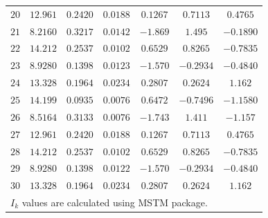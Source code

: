 \documentclass[preprint,3p]{elsarticle}
\begin{document}
\begin{table}[h]
\begin{center}
\begin{tabular}{|c|c|c|c|c|c|c|}
			$20$ & $12.961$ & $0.2420$ & $0.0188$ & $0.1267$ & $0.7113$ & $0.4765$ \\
			$21$ & $8.2160$ & $0.3217$ & $0.0142$ & $-1.869$ & $1.495$ & $-0.1890$ \\
			$22$ & $14.212$ & $0.2537$ & $0.0102$ & $0.6529$ & $0.8265$ & $-0.7835$ \\
			$23$ & $8.9280$ & $0.1398$ & $0.0123$ & $-1.570$ &	$-0.2934$ & $-0.4840$ \\
			$24$ & $13.328$ & $0.1964$ & $0.0234$ & $0.2807$ & $0.2624$ & $1.162$ \\
			$25$ & $14.199$ & $0.0935$ & $0.0076$ & $0.6472$ & $-0.7496$ & $-1.1580$ \\
			$26$ & $8.5164$ & $0.3133$ & $0.0076$ & $-1.743$	& $1.411$ & $-1.157$ \\
			$27$ & $12.961$ & $0.2420$ & $0.0188$ & $0.1267$	& $0.7113$ & $0.4765$ \\
			$28$ & $14.212$ & $0.2537$ & $0.0102$ & $0.6529$ & $0.8265$ & $-0.7835$ \\
			$29$ & $8.9280$ & $0.1398$ & $0.0122$ & $-1.570$ &	$-0.2934$ & $-0.4840$ \\
			$30$ & $13.328$ & $0.1964$ & $0.0234$ & $0.2807$ & $0.2624$ & $1.162$ \\
			\hline\hline
			\multicolumn{7}{l}{\small *$I_k$ values are calculated using MSTM package.}
		\end{tabular}
	\end{center}
\end{table}
\end{document}
